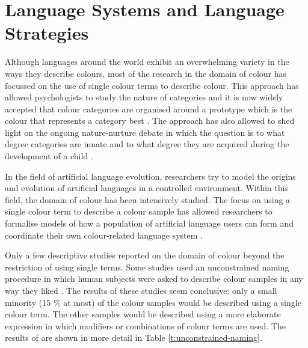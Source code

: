 \chapter{Language Systems and Language Strategies}

Although languages around the world exhibit an overwhelming variety in
the ways they describe colours, most of the research in the domain of
colour has focussed on the use of single colour terms to describe
colour. This approach has allowed psychologists to study the nature of
categories and it is now widely accepted that colour categories are organised around a
prototype which is the colour that represents a category best
\citep{rosch73natural}. The approach has also allowed to shed light
on the ongoing nature-nurture debate in which the question is to what
degree categories are innate and to what degree they are acquired
during the development of a child \citep{berlin69basic}.

In the field of artificial language evolution, researchers try to
model the origins and evolution of artificial languages in a
controlled environment. Within this field, the domain of colour has
been intensively studied. The focus on using a single colour term to
describe a colour sample has allowed researchers to formalise models
of how a population of artificial language users can form and
coordinate their own colour-related language system
\citep{steels05coordinating, belpaeme05explaining, belpaeme07language,
  puglisi08cultural, baronchelli10modeling}.

Only a few descriptive studies reported on the domain of colour beyond
the restriction of using single terms. Some studies used an
unconstrained naming procedure in which human subjects were asked to
describe colour samples in any way they liked \citep{simpson91sex,
  lin01unconstrained}. The results of these studies seem conclusive:
only a small minority (15 \% at most) of the colour samples would be
described using a single colour term. The other samples would be
described using a more elaborate expression in which modifiers or
combinations of colour terms are used. The results of
\citet{lin01unconstrained} are shown in more detail in Table
\ref{t:unconstrained-naming}.

